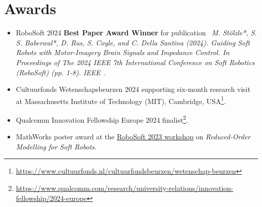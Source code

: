 \section*{Awards}
\begin{itemize}
    \item[\faTrophy] RoboSoft 2024 \textbf{Best Paper Award Winner} for publication \faFileTextO \ \emph{M. Stölzle*, S. S. Baberwal*, D. Rus, S. Coyle, and C. Della Santina (2024). Guiding Soft Robots with Motor-Imagery Brain Signals and Impedance Control. In Proceedings of The 2024 IEEE 7th International Conference on Soft Robotics (RoboSoft) (pp. 1-8). IEEE}~\cite{stolzle2024guiding}.
    \item[\faTrophy] Cultuurfonds Wetenschapsbeurzen 2024 supporting six-month research visit at Massachusetts Institute of Technology (MIT), Cambridge, USA\footnote{\url{https://www.cultuurfonds.nl/cultuurfondsbeurzen/wetenschap-beurzen}}.
    \item[\faTrophy] Qualcomm Innovation Fellowship Europe 2024 finalist\footnote{\url{https://www.qualcomm.com/research/university-relations/innovation-fellowship/2024-europe}}.
    \item[\faTrophy] MathWorks poster award at the \href{https://sites.google.com/view/robosoft2023-workshop-rom/home}{RoboSoft 2023 workshop} on \emph{Reduced-Order Modelling for Soft Robots}.
\end{itemize}

